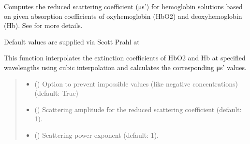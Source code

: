 \documentclass[letterpaper,10pt,english]{sphinxmanual}
\begin{document}
\begin{fulllineitems}
\label{\detokenize{generated/photon_canon.contrib.bio:photon_canon.contrib.bio.hemoglobin_mus}}
\pysigstartsignatures
\pysiglinewithargsret
{}
{\sphinxparamcomma {}\sphinxparamcomma {}\sphinxparamcomma {}\sphinxparamcomma {}\sphinxparamcomma {}}
{}
\pysigstopsignatures
\sphinxAtStartPar
Computes the reduced scattering coefficient (μs’) for hemoglobin solutions
based on given absorption coefficients of oxyhemoglobin (HbO2) and deoxyhemoglobin (Hb). See {\hyperref[\detokenize{generated/photon_canon.contrib.bio:photon_canon.contrib.bio.calculate_mus}]{}}
for more details.

\sphinxAtStartPar
Default values are supplied via Scott Prahl at 

\sphinxAtStartPar
This function interpolates the extinction coefficients of HbO2 and Hb
at specified wavelengths using cubic interpolation and calculates the
corresponding μs’ values.
\begin{quote}\begin{description}
\begin{itemize}
\item {} 
\sphinxAtStartPar
{} () \textendash{} Option to prevent impossible values (like negative concentrations) (default: True)

\item {} 
\sphinxAtStartPar
{} () \textendash{} Scattering amplitude for the reduced scattering coefficient (default: 1).

\item {} 
\sphinxAtStartPar
{} () \textendash{} Scattering power exponent (default: 1).


\end{itemize}
\end{description}
\end{quote}
\end{fulllineitems}
\end{document}
